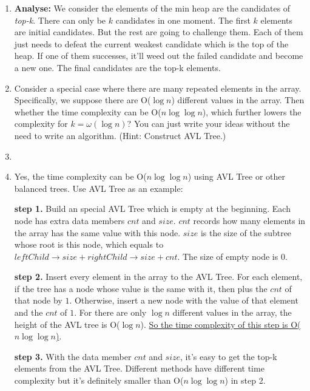 \documentclass[12pt,a4paper]{article}
\makeatletter
\newtheorem*{solution}{Solution}
\theoremstyle{definition}
\renewenvironment{solution}[1][Solution] {\par\pushQED{\qed}\normalfont\topsep6\p@\@plus6\p@\relax\trivlist\item[\hskip\labelsep\bfseries#1\@addpunct{.}]\ignorespaces}{\popQED\endtrivlist\@endpefalse} \makeatother
\makeatother
\begin{document}
\begin{enumerate}
\begin{enumerate}
\begin{solution}
            \textbf{Analyse:} We consider the elements of the min heap are the candidates of \emph{top-k}. There can only be $k$ candidates in one moment. The first $k$ elements are initial candidates. But the rest are going to challenge them. Each of them just needs to defeat the current weakest candidate which is the top of the heap. If one of them successes, it'll weed out the failed candidate and become a new one. The final candidates are the top-k elements.
        \end{solution}

    \item {\color{red}{(Optional Sub-question with Bonus)}} Consider a special case where there are many repeated elements in the array. Specifically, we suppose there are O($\log n$) different values in the array. Then whether the time complexity can be O($n \log\log n$), which further lowers the complexity for $k=\omega(\log n)$? You can just write your ideas without the need to write an algorithm. {\color{blue}(Hint: Construct AVL Tree.)}
        \begin{solution}
        \item Yes, the time complexity can be O($n \log\log n$) using AVL Tree or other balanced trees. Use AVL Tree as an example:

            \textbf{step 1.} Build an special AVL Tree which is empty at the beginning. Each node has extra data members $cnt$ and $size$. $cnt$ records how many elements in the array has the same value with this node. $size$ is the size of the subtree whose root is this node, which equals to $leftChild\rightarrow size+rightChild\rightarrow size+cnt$. The size of empty node is $0$.

            \textbf{step 2.} Insert every element in the array to the AVL Tree. For each element, if the tree has a node whose value is the same with it, then plus the $cnt$ of that node by $1$. Otherwise, insert a new node with the value of that element and the $cnt$ of $1$. For there are only $\log n$ different values in the array, the height of the AVL tree is O($\log n$).
            \underline{So the time complexity of this step is O($n\log\log n$)}.

            \textbf{step 3.} With the data member $cnt$ and $size$, it's easy to get the top-k elements from the AVL Tree. Different methods have different time complexity but it's definitely smaller than O($n\log\log n$) in step 2.
        \end{solution}
    \end{enumerate}
\end{enumerate}
\end{document}
